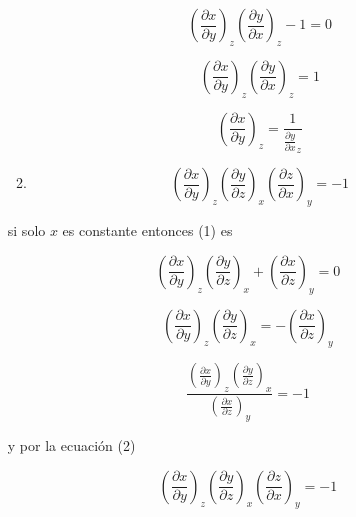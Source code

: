 \documentclass[12pt,a4paper]{article}
\begin{document}
\begin{enumerate}
\begin{enumerate}
    \begin{equation*}
        \left(\frac{\partial x}{\partial y}\right)_z \left(\frac{\partial y}{\partial x}\right)_z -1 = 0
    \end{equation*}
    
    \begin{equation*}
        \left(\frac{\partial x}{\partial y}\right)_z \left(\frac{\partial y}{\partial x}\right)_z = 1
    \end{equation*}
    
    \begin{equation}
        \left(\frac{\partial x}{\partial y}\right)_z = \frac{1}{\frac{\partial y}{\partial x}_z}
    \end{equation}
    
    
    \item
    
    \begin{equation*}
        \left(\frac{\partial x}{\partial y}\right)_z\left(\frac{\partial y}{\partial z}\right)_x\left(\frac{\partial z}{\partial x}\right)_y=-1
    \end{equation*}
    \end{enumerate}
    
    si solo $x$ es constante entonces (1) es 
    
    \begin{equation*}
        \left(\frac{\partial x}{\partial y}\right)_z \left(\frac{\partial y}{\partial z}\right)_x + \left(\frac{\partial x}{\partial z}\right)_y = 0
    \end{equation*}
    
    \begin{equation*}
        \left(\frac{\partial x}{\partial y}\right)_z \left(\frac{\partial y}{\partial z}\right)_x = - \left(\frac{\partial x}{\partial z}\right)_y
    \end{equation*}
    
    \begin{equation*}
        \frac{\left(\frac{\partial x}{\partial y}\right)_z \left(\frac{\partial y}{\partial z}\right)_x}{\left(\frac{\partial x}{\partial z}\right)_y} = -1
    \end{equation*}
    
    y por la ecuación (2)
    
    \begin{equation*}
        \left(\frac{\partial x}{\partial y}\right)_z\left(\frac{\partial y}{\partial z}\right)_x\left(\frac{\partial z}{\partial x}\right)_y=-1
    \end{equation*}
\end{enumerate}
\end{document}
